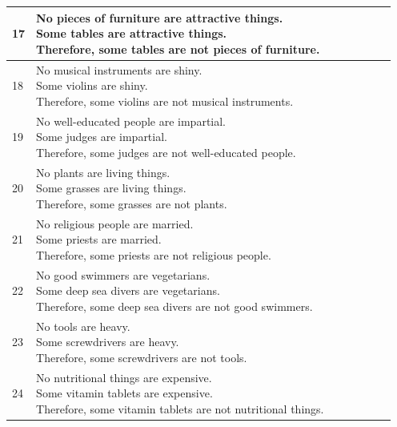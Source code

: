 \documentclass[10pt]{article}
\newcommand{\ptick}{\ding{51}}
\newcommand{\pcross}{\ding{55}}
\begin{document}
\begin{center}
\begin{tabular}{|l|l|c|c|c|c|c|}
			17 &\makecell[l]{No pieces of furniture are attractive things.\\ Some tables are attractive things.\\Therefore, some tables are not pieces of furniture.} & \ptick & &  & \ptick& \pcross\\ \hline
			18 &\makecell[l]{No musical instruments are shiny.\\Some violins are shiny.\\Therefore, some violins are not musical instruments.} & \ptick & &  & \ptick& \pcross\\ \hline
			19 &\makecell[l]{No well-educated people are impartial.\\Some judges are impartial.\\Therefore, some judges are not well-educated people.} & \ptick & &  & \ptick& \pcross\\ \hline
			20 &\makecell[l]{No plants are living things.\\Some grasses are living things.\\Therefore, some grasses are not plants.} & \ptick & &  & \ptick& \pcross\ \\ \hline
			21 &\makecell[l]{No religious people are married.\\Some priests are married.\\Therefore, some priests are not religious people.} & \ptick & &  & \ptick& \pcross \\ \hline
			22 &\makecell[l]{No good swimmers are vegetarians.\\Some deep sea divers are vegetarians.\\Therefore, some deep sea divers are not good swimmers.} & \ptick & &  & \ptick& \pcross\\ \hline
			23 &\makecell[l]{No tools are heavy.\\Some screwdrivers are heavy.\\Therefore, some screwdrivers are not tools.} & \ptick & &  & \ptick& \pcross \\ \hline
			24 &\makecell[l]{No nutritional things are expensive.\\Some vitamin tablets are expensive.\\Therefore, some vitamin tablets are not nutritional things.} & \ptick & &  & \ptick& \pcross\\ \hline
			

\end{tabular}
\end{center}
\end{document}

